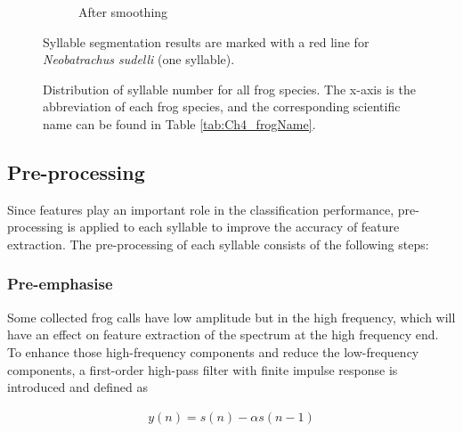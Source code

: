 \begin{figure}[htb!]
\begin{subfigure}[b]{0.6\linewidth}
                \caption{After smoothing}
        \end{subfigure}
        \caption[Syllable segmentation results]{Syllable segmentation results are marked with a red
line for \textit{Neobatrachus sudelli} (one syllable).}       
        \label{fig:smooth}
\end{figure}



\begin{figure}[htb!] %
\caption[Distribution of syllable number for all frog species]{Distribution of syllable number for all frog species. The x-axis is the abbreviation of each frog species, and the corresponding scientific name can be found in Table \ref{tab:Ch4_frogName}.}
\label{fig:Ch4_syllable} 
\end{figure}


\subsection{Pre-processing}
Since features play an important role in the classification performance, pre-processing is applied to each syllable to improve the accuracy of feature extraction. The pre-processing of each syllable consists of the following steps:

\subsubsection{Pre-emphasise}
Some collected frog calls have low amplitude but in the high frequency, which will have an effect on feature extraction of the spectrum at the high frequency end. To enhance those high-frequency components and reduce the low-frequency components, a first-order high-pass filter with finite impulse response is introduced and defined as

\begin{align}
y(n) = s(n)-\alpha s(n-1)
\end{align}

